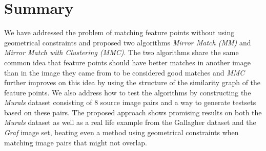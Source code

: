\documentclass[12pt,journal]{IEEEtran}
\begin{document}
\section{Summary}
We have addressed the problem of matching feature points without using 
geometrical constraints and proposed two algorithms \emph{Mirror Match 
(MM)} and \emph{Mirror Match with Clustering (MMC)}. The two algorithms 
share the same common idea that feature points should have better 
matches in another image than in the image they came from to be 
considered good matches and \emph{MMC} further improves on this idea by 
using the structure of the similarity graph of the feature points. We 
also address how to test the algorithms by constructing the 
\emph{Murals} dataset consisting of $8$ source image pairs and a way to 
generate testsets based on these pairs.  The proposed approach shows 
promising results on both the \emph{Murals} dataset as well as a real 
life example from the Gallagher dataset and the \emph{Graf} image set, 
beating even a method using geometrical constraints when matching image 
pairs that might not overlap.
%


\end{document}

